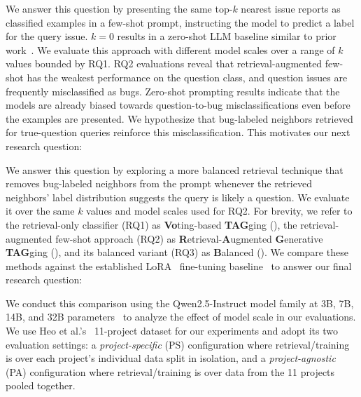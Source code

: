  We answer this question by presenting the same top-$k$ nearest issue reports as classified examples in a few-shot prompt, instructing the model to predict a label for the query issue. $k{=}0$ results in a zero-shot LLM baseline similar to prior work~\cite{colavito2025benchmarking}. We evaluate this approach with different model scales over a range of $k$ values bounded by RQ1.
RQ2 evaluations reveal that retrieval-augmented few-shot has the weakest performance on the question class, and question issues are frequently misclassified as bugs. Zero-shot prompting results indicate that the models are already biased towards question-to-bug misclassifications even before the examples are presented. We hypothesize that bug-labeled neighbors retrieved for true-question queries reinforce this misclassification. This motivates our next research question:

 We answer this question by exploring a more balanced retrieval technique that removes bug-labeled neighbors from the prompt whenever the retrieved neighbors' label distribution suggests the query is likely a question. We evaluate it over the same $k$ values and model scales used for RQ2. For brevity, we refer to the retrieval-only classifier (RQ1) as \textbf{Vo}ting-based \textbf{TAG}ging (\votag), the retrieval-augmented few-shot approach (RQ2) as \textbf{R}etrieval-\textbf{A}ugmented \textbf{G}enerative \textbf{TAG}ging (\ragtag), and its balanced variant (RQ3) as \textbf{B}alanced \ragtag (\bragtag). We compare these methods against the established LoRA~\cite{hu2022lora} fine-tuning baseline~\cite{heo2025study, aracena2025applying, aracena2024applyinglargelanguagemodels} to answer our final research question:

 We conduct this comparison using the Qwen2.5-Instruct model family at 3B, 7B, 14B, and 32B parameters~\cite{yang2024qwen25} to analyze the effect of model scale in our evaluations. We use Heo et al.'s~\cite{heo2025study} 11-project dataset for our experiments and adopt its two evaluation settings: a \emph{project-specific} (PS) configuration where retrieval/training is over each project's individual data split in isolation, and a \emph{project-agnostic} (PA) configuration where retrieval/training is over data from the 11 projects pooled together.

